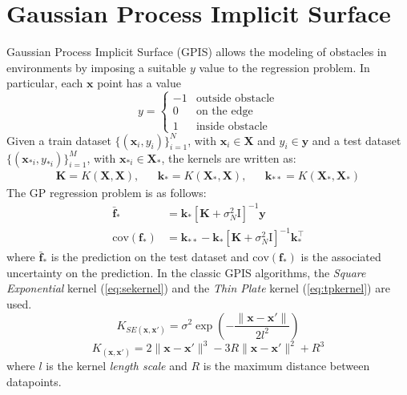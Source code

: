 \documentclass[10pt,a4paper,twocolumn]{article}
\newcommand{\trsp}{{\scriptscriptstyle\top}}
\newcommand{\cov}{\mathrm{cov}}
\begin{document}
\section{Gaussian Process Implicit Surface}\label{GPIS}
Gaussian Process Implicit Surface (GPIS) \cite{martens_geometric_2017}\cite{williams2006gaussian} allows the modeling of obstacles in environments by imposing a suitable $y$ value to the regression problem. In particular, each $\mathbf{x}$ point has a value
\begin{equation}
	y = 
	\begin{cases}
		-1 & \text{outside obstacle}\\
		0 & \text{on the edge}\\
		1 & \text{inside obstacle}
	\end{cases}
\end{equation}
Given a train dataset $ \{ (\mathbf{x}_i, y_i) \}_{i=1}^N$, with $\mathbf{x}_i \in \mathbf{X}$ and $y_i \in \mathbf{y}$ and a test dataset $\{ (\mathbf{x}_{*i}, y_{*i}) \}_{i=1}^M$, with $\mathbf{x}_{*i} \in \mathbf{X_*}$, the kernels are written as:
\small
\begin{align}
	\mathbf{K} = K(\mathbf{X},\mathbf{X}), && \mathbf{k_*} = K(\mathbf{X_*},\mathbf{X}), && \mathbf{k_{**}} = K(\mathbf{X_*},\mathbf{X_*})
\end{align}
\normalsize
The GP regression problem is as follows:
\begin{equation}\label{eq:GPregr}
	\begin{aligned}
		\mathbf{\bar{f}_*} &= \mathbf{k}_*[\mathbf{K} + \sigma_N^2 \mathrm{I}]^{-1}\mathbf{y}\\    
		\cov(\mathbf{f}_*) &= \mathbf{k}_{**} - \mathbf{k}_*[\mathbf{K} + \sigma_N^2 \mathrm{I}]^{-1}\mathbf{k}_*^\trsp
	\end{aligned}
\end{equation}
where $\mathbf{\bar{f}_*}$ is the prediction on the test dataset and $\cov(\mathbf{f}_*)$ is the associated uncertainty on the prediction.
In the classic GPIS algorithms, the \textit{Square Exponential} kernel (\autoref{eq:sekernel}) and the \textit{Thin Plate} \cite{williams2006gaussian} kernel (\autoref{eq:tpkernel}) are used.
\begin{equation}\label{eq:sekernel}
	K_{SE(\mathbf{x}, \mathbf{x'})}  = \sigma^2 \exp \left( -\frac{\| \mathbf{x} - \mathbf{x'} \|}{2 l^2} \right)
\end{equation}
\begin{equation}\label{eq:tpkernel}
	K_{(\mathbf{x}, \mathbf{x'})} = 2\|\mathbf{x} - \mathbf{x'}\|^3 - 3R \|\mathbf{x} - \mathbf{x'}\|^2 + R^3
\end{equation}
where $l$ is the kernel \textit{length scale} and $R$ is the maximum distance between datapoints.
\end{document}
